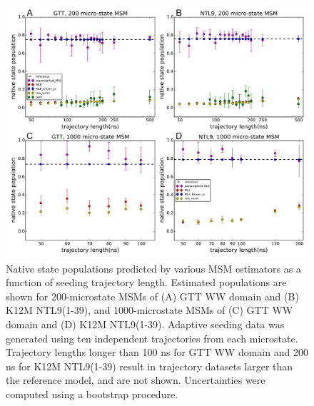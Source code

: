 \documentclass[%
 aip,
rsi,%
 amsmath,amssymb,
 reprint,%
]{revtex4-1}
\begin{document}
\begin{figure}[ht!]
\includegraphics[width=0.55\paperwidth]{figures/NTL9_GTT/SI/native_population_10trajs_cluster200_1000_omi_new.pdf}%
\caption{Native state populations predicted by various MSM estimators as a function of seeding trajectory length. Estimated populations are shown for 200-microstate MSMs of (A) GTT WW domain and (B) K12M NTL9(1-39), and 1000-microstate MSMs of (C) GTT WW domain and (D) K12M NTL9(1-39). Adaptive seeding data was generated using ten independent trajectories from each microstate. Trajectory lengths longer than 100 ns for GTT WW domain and 200 ns for K12M NTL9(1-39) result in trajectory datasets larger than the reference model, and are not shown. Uncertainties were computed using a bootstrap procedure.}
\label{fig:all-atom-nativepops-10seeds}
\end{figure}



\end{document}
